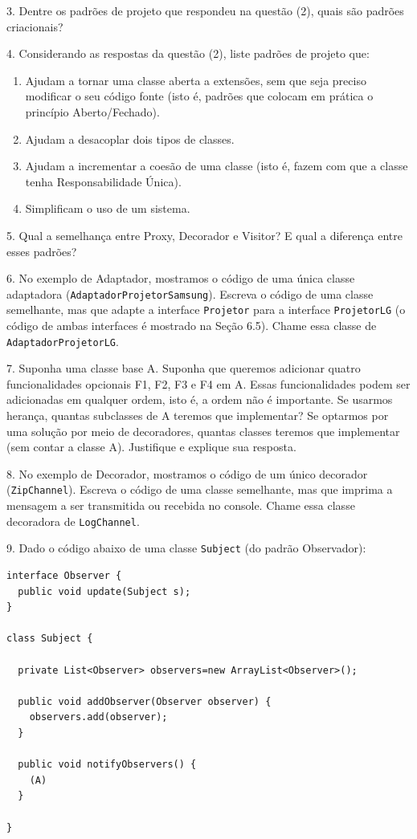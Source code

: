 \documentclass[
  11pt,
  twoside]{book}
\newcommand{\passthrough}[1]{#1}
\begin{document}
3. Dentre os padrões de projeto que respondeu na questão (2), quais são
padrões criacionais?

4. Considerando as respostas da questão (2), liste padrões de projeto
que:

\begin{enumerate}
\def\labelenumi{\alph{enumi})}
\item
  Ajudam a tornar uma classe aberta a extensões, sem que seja preciso
  modificar o seu código fonte (isto é, padrões que colocam em prática o
  princípio Aberto/Fechado).
\item
  Ajudam a desacoplar dois tipos de classes.
\item
  Ajudam a incrementar a coesão de uma classe (isto é, fazem com que a
  classe tenha Responsabilidade Única).
\item
  Simplificam o uso de um sistema.
\end{enumerate}

5. Qual a semelhança entre Proxy, Decorador e Visitor? E qual a
diferença entre esses padrões?

6. No exemplo de Adaptador, mostramos o código de uma única classe
adaptadora (\passthrough{\lstinline!AdaptadorProjetorSamsung!}). Escreva
o código de uma classe semelhante, mas que adapte a interface
\passthrough{\lstinline!Projetor!} para a interface
\passthrough{\lstinline!ProjetorLG!} (o código de ambas interfaces é
mostrado na Seção 6.5). Chame essa classe de
\passthrough{\lstinline!AdaptadorProjetorLG!}.

7. Suponha uma classe base A. Suponha que queremos adicionar quatro
funcionalidades opcionais F1, F2, F3 e F4 em A. Essas funcionalidades
podem ser adicionadas em qualquer ordem, isto é, a ordem não é
importante. Se usarmos herança, quantas subclasses de A teremos que
implementar? Se optarmos por uma solução por meio de decoradores,
quantas classes teremos que implementar (sem contar a classe A).
Justifique e explique sua resposta.

8. No exemplo de Decorador, mostramos o código de um único decorador
(\passthrough{\lstinline!ZipChannel!}). Escreva o código de uma classe
semelhante, mas que imprima a mensagem a ser transmitida ou recebida no
console. Chame essa classe decoradora de
\passthrough{\lstinline!LogChannel!}.

9. Dado o código abaixo de uma classe \passthrough{\lstinline!Subject!}
(do padrão Observador):

\begin{lstlisting}
interface Observer {
  public void update(Subject s);
}

class Subject {

  private List<Observer> observers=new ArrayList<Observer>();

  public void addObserver(Observer observer) {
    observers.add(observer);
  }

  public void notifyObservers() {
    (A)
  }

}
\end{lstlisting}
\end{document}
